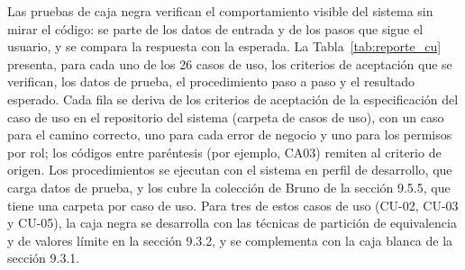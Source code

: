 Las pruebas de caja negra verifican el comportamiento visible del sistema sin mirar el código: se parte de los datos de entrada y de los pasos que sigue el usuario, y se compara la respuesta con la esperada. La Tabla~\ref{tab:reporte_cu} presenta, para cada uno de los 26 casos de uso, los criterios de aceptación que se verifican, los datos de prueba, el procedimiento paso a paso y el resultado esperado. Cada fila se deriva de los criterios de aceptación de la especificación del caso de uso en el repositorio del sistema (carpeta de casos de uso), con un caso para el camino correcto, uno para cada error de negocio y uno para los permisos por rol; los códigos entre paréntesis (por ejemplo, CA03) remiten al criterio de origen. Los procedimientos se ejecutan con el sistema en perfil de desarrollo, que carga datos de prueba, y los cubre la colección de Bruno de la sección 9.5.5, que tiene una carpeta por caso de uso. Para tres de estos casos de uso (CU-02, CU-03 y CU-05), la caja negra se desarrolla con las técnicas de partición de equivalencia y de valores límite en la sección 9.3.2, y se complementa con la caja blanca de la sección 9.3.1.

